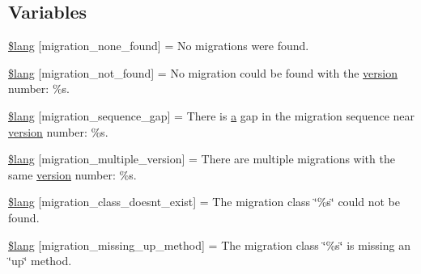 \subsection*{Variables}
\begin{DoxyCompactItemize}
\item 
\hyperlink{_admin_2system_2language_2english_2migration__lang_8php_affa6337f0973de810b3c61491deae6b1}{\$lang} \mbox{[}\textquotesingle{}migration\+\_\+none\+\_\+found\textquotesingle{}\mbox{]} = \textquotesingle{}No migrations were found.\textquotesingle{}
\item 
\hyperlink{_admin_2system_2language_2english_2migration__lang_8php_a92dd777422d70950993d43f4d0c31b1b}{\$lang} \mbox{[}\textquotesingle{}migration\+\_\+not\+\_\+found\textquotesingle{}\mbox{]} = \textquotesingle{}No migration could be found with the \hyperlink{_admin_2assets_2js_2bootstrap_8js_a614229fff4211edebc3c193d1e7763ec}{version} number\+: \%s.\textquotesingle{}
\item 
\hyperlink{_admin_2system_2language_2english_2migration__lang_8php_ab1f43d98bc1365f4b753d783a8802697}{\$lang} \mbox{[}\textquotesingle{}migration\+\_\+sequence\+\_\+gap\textquotesingle{}\mbox{]} = \textquotesingle{}There is \hyperlink{_admin_2assets_2js_2bootstrap_8min_8js_a1f5870dcf487187f13d5fd328ed9e6e7}{a} gap in the migration sequence near \hyperlink{_admin_2assets_2js_2bootstrap_8js_a614229fff4211edebc3c193d1e7763ec}{version} number\+: \%s.\textquotesingle{}
\item 
\hyperlink{_admin_2system_2language_2english_2migration__lang_8php_a1a98130d04f280e6a5f6f509179f9e01}{\$lang} \mbox{[}\textquotesingle{}migration\+\_\+multiple\+\_\+version\textquotesingle{}\mbox{]} = \textquotesingle{}There are multiple migrations with the same \hyperlink{_admin_2assets_2js_2bootstrap_8js_a614229fff4211edebc3c193d1e7763ec}{version} number\+: \%s.\textquotesingle{}
\item 
\hyperlink{_admin_2system_2language_2english_2migration__lang_8php_a141dceda5b8294f6e4ddf7e5da6fe71d}{\$lang} \mbox{[}\textquotesingle{}migration\+\_\+class\+\_\+doesnt\+\_\+exist\textquotesingle{}\mbox{]} = \textquotesingle{}The migration class \char`\"{}\%s\char`\"{} could not be found.\textquotesingle{}
\item 
\hyperlink{_admin_2system_2language_2english_2migration__lang_8php_a4bc9c60a4f078d1845d1d72370c363e8}{\$lang} \mbox{[}\textquotesingle{}migration\+\_\+missing\+\_\+up\+\_\+method\textquotesingle{}\mbox{]} = \textquotesingle{}The migration class \char`\"{}\%s\char`\"{} is missing an \char`\"{}up\char`\"{} method.\textquotesingle{}

\end{DoxyCompactItemize}
